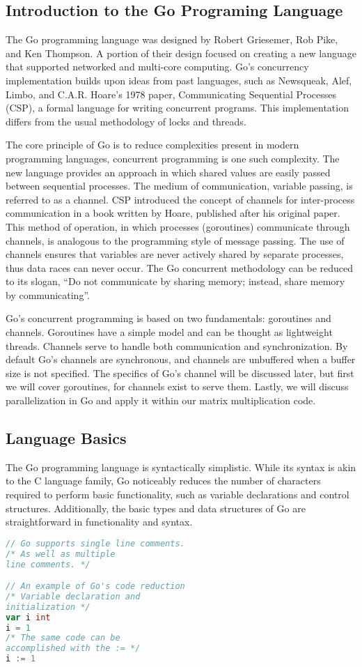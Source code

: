 \goColor
\subsection{Introduction to the Go Programing Language}
	The Go programming language was designed by Robert Griesemer, Rob Pike, and Ken Thompson. A portion of their design focused on creating a new language that supported networked and multi-core computing. Go’s concurrency implementation builds upon ideas from past languages, such as Newsqueak, Alef, Limbo, and C.A.R. Hoare’s 1978 paper, Communicating Sequential Processes (CSP), a formal language for writing concurrent programs. \cite{prell:hal-00718924} This implementation differs from the usual methodology of locks and threads.
	
	The core principle of Go is to reduce complexities present in modern programming languages, concurrent programming is one such complexity. The new language provides an approach in which shared values are easily passed between sequential processes. The medium of communication, variable passing, is referred to as a channel. CSP introduced the concept of channels for inter-process communication in a book written by Hoare, published after his original paper. This method of operation, in which processes (goroutines) communicate through channels, is analogous to the programming style of message passing. The use of channels ensures that variables are never actively shared by separate processes, thus data races can never occur. The Go concurrent methodology can be reduced to its slogan, “Do not communicate by sharing memory; instead, share memory by communicating”. \cite{website:go-lang-documentation}
	
	Go’s concurrent programming is based on two fundamentals: goroutines and channels. Goroutines have a simple model and can be thought as lightweight threads. Channels serve to handle both communication and synchronization. By default Go’s channels are synchronous, and channels are unbuffered when a buffer size is not specified. \cite{prell:hal-00718924} The specifics of Go’s channel will be discussed later, but first we will cover goroutines, for channels exist to serve them. Lastly, we will discuss parallelization in Go and apply it within our matrix multiplication code.
\subsection{Language Basics}
The Go programming language is syntactically simplistic. While its syntax is akin to the C language family, Go noticeably reduces the number of characters required to perform basic functionality, such as variable declarations and control structures. Additionally, the basic types and data structures of Go are straightforward in functionality and syntax.
\begin{lstlisting}[language=Go]
// Go supports single line comments.
/* As well as multiple
line comments. */

// An example of Go's code reduction
/* Variable declaration and 
initialization */
var i int
i = 1
/* The same code can be
accomplished with the := */
i := 1
\end{lstlisting}
